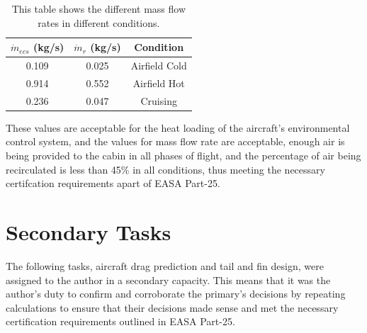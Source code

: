 \documentclass[stu, a4paper, 12pt, floatsintext]{apa7}
\numberwithin{figure}{section}
\numberwithin{table}{section}
\numberwithin{equation}{section}
\begin{document}
\begin{table}[H]
    \centering
    \caption{This table shows the different mass flow rates in different conditions. }
    \label{tab:ecs_final_mass}
    \begin{tabular}{@{}ccc@{}}
    \toprule
    \textbf{$\dot m_{ecs}$ (kg/s)} & \textbf{$\dot m_r$ (kg/s)} & \textbf{Condition} \\ \midrule
    0.109                          & 0.025                      & Airfield Cold      \\
    0.914                          & 0.552                      & Airfield Hot       \\
    0.236                          & 0.047                      & Cruising           \\ \bottomrule
    \end{tabular}
\end{table}

These values are acceptable for the heat loading of the aircraft’s environmental control system, and the values for mass flow rate are acceptable, enough air is being provided to the cabin in all phases of flight, and the percentage of air being recirculated is less than 45\% in all conditions, thus meeting the necessary certifcation requirements apart of EASA Part-25. 

\section{Secondary Tasks}
The following tasks, aircraft drag prediction and tail and fin design, were assigned to the author in a secondary capacity. This means that it was the author’s duty to confirm and corroborate the primary’s decisions by repeating calculations to ensure that their decisions made sense and met the necessary certification requirements outlined in EASA Part-25.  
\end{document}
